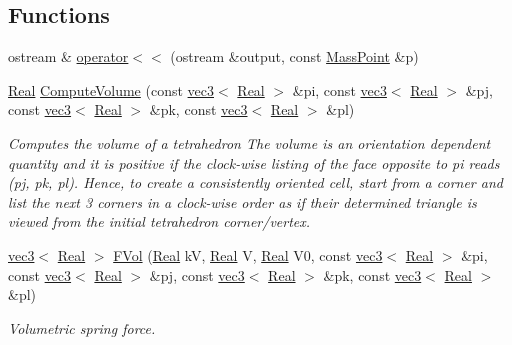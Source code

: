 \subsection*{Functions}
\begin{DoxyCompactItemize}
\item 
ostream \& \hyperlink{namespace_filum_aea16f6c764a7c50bde4714d925c957a4}{operator$<$$<$} (ostream \&output, const \hyperlink{class_filum_1_1_mass_point}{Mass\-Point} \&p)
\item 
\hyperlink{stdafx_8h_a445a5f0e2a34c9d97d69a3c2d1957907}{Real} \hyperlink{namespace_filum_affcb2b67ce8514ec98a8ff938fb202ab}{Compute\-Volume} (const \hyperlink{structvmath_1_1vec3}{vec3}$<$ \hyperlink{stdafx_8h_a445a5f0e2a34c9d97d69a3c2d1957907}{Real} $>$ \&pi, const \hyperlink{structvmath_1_1vec3}{vec3}$<$ \hyperlink{stdafx_8h_a445a5f0e2a34c9d97d69a3c2d1957907}{Real} $>$ \&pj, const \hyperlink{structvmath_1_1vec3}{vec3}$<$ \hyperlink{stdafx_8h_a445a5f0e2a34c9d97d69a3c2d1957907}{Real} $>$ \&pk, const \hyperlink{structvmath_1_1vec3}{vec3}$<$ \hyperlink{stdafx_8h_a445a5f0e2a34c9d97d69a3c2d1957907}{Real} $>$ \&pl)
\begin{DoxyCompactList}\small\item\em Computes the volume of a tetrahedron The volume is an orientation dependent quantity and it is positive if the clock-\/wise listing of the face opposite to pi reads (pj, pk, pl). Hence, to create a consistently oriented cell, start from a corner and list the next 3 corners in a clock-\/wise order as if their determined triangle is viewed from the initial tetrahedron corner/vertex. \end{DoxyCompactList}\item 
\hyperlink{structvmath_1_1vec3}{vec3}$<$ \hyperlink{stdafx_8h_a445a5f0e2a34c9d97d69a3c2d1957907}{Real} $>$ \hyperlink{namespace_filum_af1b1b869b73490566e12fc519dfdc920}{F\-Vol} (\hyperlink{stdafx_8h_a445a5f0e2a34c9d97d69a3c2d1957907}{Real} k\-V, \hyperlink{stdafx_8h_a445a5f0e2a34c9d97d69a3c2d1957907}{Real} V, \hyperlink{stdafx_8h_a445a5f0e2a34c9d97d69a3c2d1957907}{Real} V0, const \hyperlink{structvmath_1_1vec3}{vec3}$<$ \hyperlink{stdafx_8h_a445a5f0e2a34c9d97d69a3c2d1957907}{Real} $>$ \&pi, const \hyperlink{structvmath_1_1vec3}{vec3}$<$ \hyperlink{stdafx_8h_a445a5f0e2a34c9d97d69a3c2d1957907}{Real} $>$ \&pj, const \hyperlink{structvmath_1_1vec3}{vec3}$<$ \hyperlink{stdafx_8h_a445a5f0e2a34c9d97d69a3c2d1957907}{Real} $>$ \&pk, const \hyperlink{structvmath_1_1vec3}{vec3}$<$ \hyperlink{stdafx_8h_a445a5f0e2a34c9d97d69a3c2d1957907}{Real} $>$ \&pl)
\begin{DoxyCompactList}\small\item\em Volumetric spring force. \end{DoxyCompactList}\item 

\end{DoxyCompactItemize}
